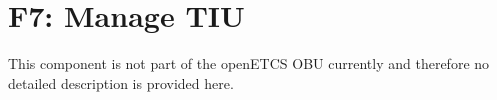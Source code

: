 \documentclass[oneside]{template/openetcs_report}
\begin{document}
\chapter{F7: Manage TIU}
This component is not part of the openETCS OBU currently and therefore no detailed description is provided here.






\end{document}
